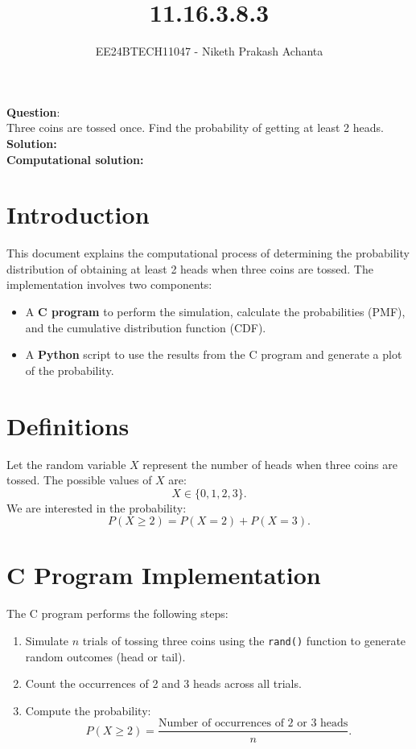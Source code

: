 \documentclass[journal]{IEEEtran}
\begin{document}
	
	
	\vspace{3cm}
	
	\title{11.16.3.8.3}
	\author{EE24BTECH11047 - Niketh Prakash Achanta }
	{\let\newpage\relax\maketitle}
	
	\renewcommand{\thefigure}{\theenumi}
	\renewcommand{\thetable}{\theenumi}
	\setlength{\intextsep}{10pt} %
	
	
	\renewcommand{\thetable}{\theenumi}
	
	
\textbf{Question}:\\
Three coins are tossed once. Find the probability of getting at least 2 heads. \\
\textbf{Solution: }\\
\textbf{Computational solution: }\\

\section*{Introduction}
This document explains the computational process of determining the probability distribution of obtaining at least 2 heads when three coins are tossed. The implementation involves two components:
\begin{itemize}
    \item A \textbf{C program} to perform the simulation, calculate the probabilities (PMF), and the cumulative distribution function (CDF).
    \item A \textbf{Python} script to use the results from the C program and generate a plot of the probability.
\end{itemize}

\section*{Definitions}
Let the random variable \( X \) represent the number of heads when three coins are tossed. The possible values of \( X \) are:
\[
X \in \{0, 1, 2, 3\}.
\]
We are interested in the probability:
\[
P(X \geq 2) = P(X = 2) + P(X = 3).
\]

\section*{C Program Implementation}
The C program performs the following steps:
\begin{enumerate}
    \item Simulate \( n \) trials of tossing three coins using the \texttt{rand()} function to generate random outcomes (head or tail).
    \item Count the occurrences of 2 and 3 heads across all trials.
    \item Compute the probability:
    \[
    P(X \geq 2) = \frac{\text{Number of occurrences of 2 or 3 heads}}{n}.
    \]
\end{enumerate}
\end{document}
